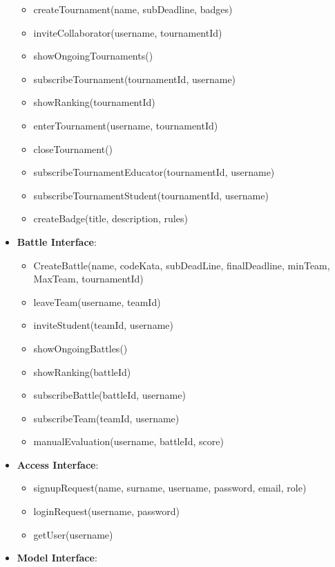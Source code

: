 \begin{itemize}
\begin{itemize}
            \item createTournament(name, subDeadline, badges)
            \item inviteCollaborator(username, tournamentId)
            \item showOngoingTournaments()
            \item subscribeTournament(tournamentId, username)
            \item showRanking(tournamentId)
            \item enterTournament(username, tournamentId)
            \item closeTournament()
            \item subscribeTournamentEducator(tournamentId, username)
            \item subscribeTournamentStudent(tournamentId, username)
            \item createBadge(title, description, rules)
        \end{itemize}
    \item\textbf{Battle Interface}:
        \begin{itemize}
            \item CreateBattle(name, codeKata, subDeadLine, finalDeadline, minTeam, MaxTeam, tournamentId)
            \item leaveTeam(username, teamId)
            \item inviteStudent(teamId, username)
            \item showOngoingBattles()
            \item showRanking(battleId)
            \item subscribeBattle(battleId, username)
            \item subscribeTeam(teamId, username)
            \item manualEvaluation(username, battleId, score)
        \end{itemize}
    \item\textbf{Access Interface}:
        \begin{itemize}
            \item  signupRequest(name, surname, username, password, email, role)
            \item loginRequest(username, password)
            \item getUser(username)
        \end{itemize}
    \item\textbf{Model Interface}:
        \begin{itemize}

\end{itemize}
\end{itemize}
